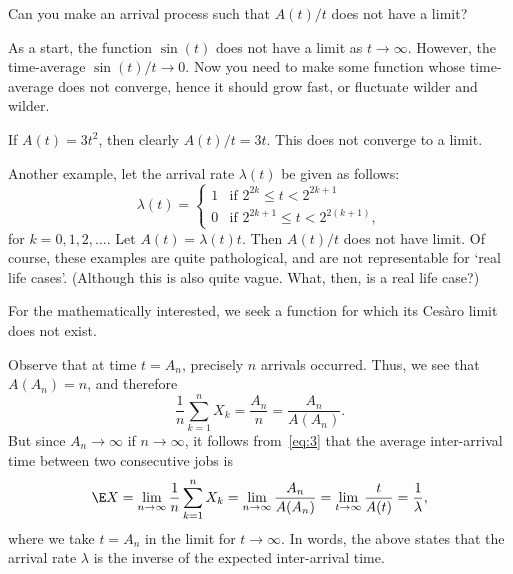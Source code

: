 \begin{extra}
 Can you make an arrival process such that $A(t)/t$ does not have a
 limit? 
\begin{hint}
As a start, the function $\sin(t)$ does not have a limit as
 $t\to\infty$. However, the time-average $\sin(t)/t \to 0$. Now
 you need to make some function whose time-average does not
 converge, hence it should grow fast, or fluctuate wilder and
 wilder.
\end{hint}
\begin{solution}
 If $A(t) = 3 t^2$, then clearly $A(t)/t = 3t$. This does not
 converge to a limit. 

 Another example, let the arrival rate $\lambda(t)$ be given as
 follows:
 \begin{equation*}
 \lambda(t) = 
 \begin{cases}
 1 & \text{if } 2^{2k} \leq t < 2^{2k+1} \\
 0 & \text{if } 2^{2k+1} \leq t < 2^{2(k+1)},
 \end{cases}
 \end{equation*}
 for $k=0,1,2,\ldots$. Let $A(t) = \lambda(t) t$. Then $A(t)/t$
 does not have limit. Of course, these examples are quite
 pathological, and are not representable for `real life cases'.
 (Although this is also quite vague. What, then, is a real life
 case?)

For the mathematically interested, we seek a
 function for which its Ces\`aro limit does not exist.
\end{solution}
\end{extra}



Observe that at time $t=A_n$, precisely $n$ arrivals occurred.
Thus,
we see that $A(A_n) = n$, and therefore
\begin{equation*}
 \frac{1}n\sum_{k=1}^n X_k = \frac{A_n}n = \frac{A_n}{A(A_n)}. 
\end{equation*}
But since $A_n\to\infty$ if $n\to\infty$, it follows from~\cref{eq:3} that the average inter-arrival time between two consecutive jobs is
\begin{equation}\label{eq:54}
 \E X = \lim_{n\to\infty} \frac{1}n\sum_{k=1}^n X_k = \lim_{n\to \infty} \frac{A_n}{A(A_n)} = \lim_{t\to\infty} \frac t{A(t)} = \frac 1 \lambda,
\end{equation}
where we take $t=A_n$ in the limit for $t\to\infty$.
In words, the above states that the arrival rate $\lambda$ is the inverse of the expected inter-arrival time.

